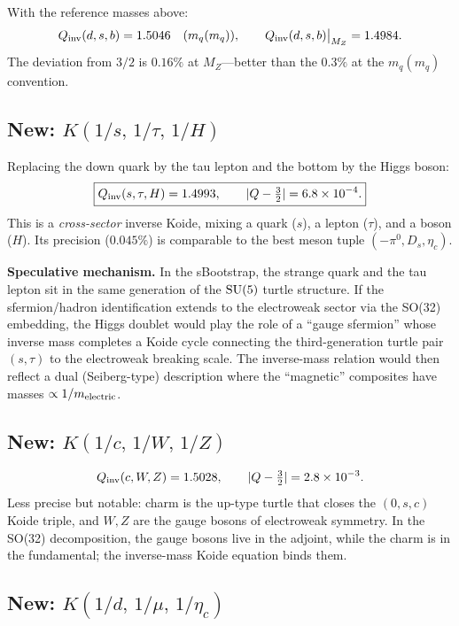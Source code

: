\documentclass[11pt]{article}
\begin{document}
With the reference masses above:
\begin{equation}
  Q_{\rm inv}(d,s,b) = 1.5046 \quad (m_q(m_q)),
  \qquad
  Q_{\rm inv}(d,s,b)\big|_{M_Z} = 1.4984.
\end{equation}
The deviation from $3/2$ is $0.16\%$ at $M_Z$---better than
the $0.3\%$ at the $m_q(m_q)$ convention.

\subsection{New: $K(1/s,\,1/\tau,\,1/H)$}
\label{sec:stH}

Replacing the down quark by the tau lepton and the bottom by
the Higgs boson:
\begin{equation}
  \boxed{Q_{\rm inv}(s,\tau,H) = 1.4993,
  \qquad |Q-\tfrac{3}{2}| = 6.8\times 10^{-4}.}
\end{equation}
This is a \emph{cross-sector} inverse Koide, mixing a quark
($s$), a lepton ($\tau$), and a boson ($H$).
Its precision ($0.045\%$) is comparable to the best meson tuple
$(-\pi^0,D_s,\eta_c)$.

\medskip\noindent\textbf{Speculative mechanism.}
In the sBootstrap, the strange quark and the tau lepton sit
in the same generation of the ${\rm SU}(5)$ turtle structure.
If the sfermion/hadron identification extends to the
electroweak sector via the SO(32) embedding, the Higgs
doublet would play the role of a ``gauge sfermion'' whose
inverse mass completes a Koide cycle connecting the
third-generation turtle pair $(s,\tau)$ to the electroweak
breaking scale.  The inverse-mass relation would then reflect
a dual (Seiberg-type) description where the ``magnetic''
composites have masses $\propto 1/m_{\rm electric}$.

\subsection{New: $K(1/c,\,1/W,\,1/Z)$}

\begin{equation}
  Q_{\rm inv}(c,W,Z) = 1.5028,
  \qquad |Q-\tfrac{3}{2}| = 2.8\times 10^{-3}.
\end{equation}
Less precise but notable: charm is the up-type turtle that
closes the $(0,s,c)$ Koide triple, and $W,Z$ are the gauge
bosons of electroweak symmetry.  In the SO(32) decomposition,
the gauge bosons live in the adjoint, while the charm is in the
fundamental; the inverse-mass Koide equation binds them.

\subsection{New: $K(1/d,\,1/\mu,\,1/\eta_c)$}
\end{document}
